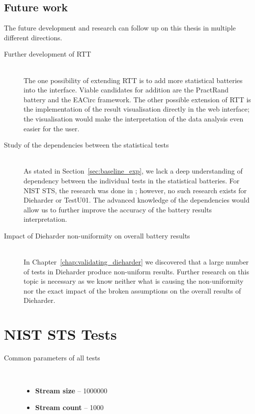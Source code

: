 \documentclass[
  digital,  	%
  color,		%
  oneside,   	%
  12pt,
  nocover,
  notable,
  nolof,
  nolot,
]{fithesis3}
\newenvironment{titlemize}[1]
{
	\begin{description}
	\item[#1]\
	\begin{itemize}
}
{
	\end{itemize}
 	\end{description}
}
\theoremstyle{definition}
\theoremstyle{remark}
\begin{document}
\section{Future work}
The future development and research can follow up on this thesis in multiple different directions.

\begin{description}
\item[Further development of RTT] \hfill \\
The one possibility of extending RTT is to add more statistical batteries into the interface. Viable candidates for addition are the PractRand battery \cite{practrand} and the EACirc framework. The other possible extension of RTT is the implementation of the result visualisation directly in the web interface; the visualisation would make the interpretation of the data analysis even easier for the user.

\item[Study of the dependencies between the statistical tests] \hfill \\
As stated in Section~\ref{sec:baseline_exp}, we lack a deep understanding of dependency between the individual tests in the statistical batteries. For NIST STS, the research was done in \cite{nist-sts-interpretation-syso}; however, no such research exists for Dieharder or TestU01. The advanced knowledge of the dependencies would allow us to further improve the accuracy of the battery results interpretation.

\item[Impact of Dieharder non-uniformity on overall battery results] \hfill \\
In Chapter~\ref{chap:validating_dieharder} we discovered that a large number of tests in Dieharder produce non-uniform results. Further research on this topic is necessary as we know neither what is causing the non-uniformity nor the exact impact of the broken assumptions on the overall results of Dieharder.

\end{description}

\appendix

\printbibliography

\chapter{NIST STS Tests}
\label{app:nist_sts_tests}

\begin{titlemize}{Common parameters of all tests}
\item \textbf{Stream size} -- 1000000
\item \textbf{Stream count} -- 1000
\end{titlemize}
\end{document}
